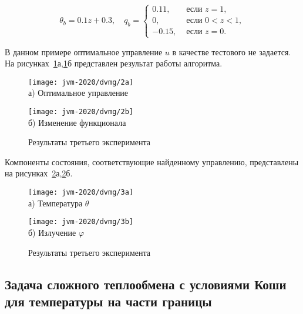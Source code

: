 \[
    \theta_{b}=0.1 z+0.3, \quad q_{b}=
    \begin{cases}
        0.11, & \text { если } z=1, \\
        0, & \text { если } 0<z<1, \\
        -0.15, & \text { если } z=0.
    \end{cases}
\]


В данном примере оптимальное управление $u$ в качестве тестового не задается.
На рисунках~\ref{fig:4_4:3}а,\ref{fig:4_4:3}б представлен результат работы алгоритма.

\begin{figure}[h!t]
    \begin{minipage}[b][][b]{0.49\linewidth}
        \centering
        \texttt{[image: jvm-2020/dvmg/2a]}
        \\ а) Оптимальное управление
    \end{minipage}
    \hfill
    \begin{minipage}[b][][b]{0.49\linewidth}
        \centering
        \texttt{[image: jvm-2020/dvmg/2b]}
        \\ б) Изменение функционала  %
    \end{minipage}
    \caption{Результаты третьего эксперимента}
    \label{fig:4_4:3}
\end{figure}

Компоненты состояния, соответствующие найденному управлению, представлены на
рисунках~\ref{fig:4_4:4}а,\ref{fig:4_4:4}б.


\begin{figure}[h!t]
    \begin{minipage}[b][][b]{0.49\linewidth}
        \centering
        \texttt{[image: jvm-2020/dvmg/3a]}
        \\ а) Температура $\theta$
    \end{minipage}
    \hfill
    \begin{minipage}[b][][b]{0.49\linewidth}
        \centering
        \texttt{[image: jvm-2020/dvmg/3b]}
        \\ б) Излучение $\varphi$
    \end{minipage}
    \caption{Результаты третьего эксперимента}
    \label{fig:4_4:4}
\end{figure}

\subsection{
    Задача сложного теплообмена с условиями
    Коши для температуры на части границы
}\label{subsec:ch4/sec4/subsec2}

